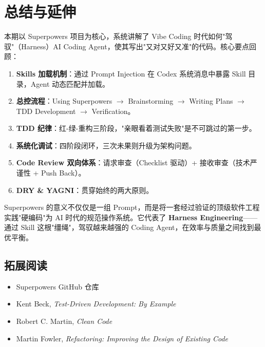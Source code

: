 \section{总结与延伸}

本期以 Superpowers 项目为核心，系统讲解了 Vibe Coding 时代如何"驾驭"（Harness）AI Coding Agent，使其写出"又对又好又准"的代码。核心要点回顾：

\begin{enumerate}
    \item \textbf{Skills 加载机制}：通过 Prompt Injection 在 Codex 系统消息中暴露 Skill 目录，Agent 动态匹配并加载。
    \item \textbf{总控流程}：Using Superpowers $\rightarrow$ Brainstorming $\rightarrow$ Writing Plans $\rightarrow$ TDD Development $\rightarrow$ Verification。
    \item \textbf{TDD 纪律}：红-绿-重构三阶段，"亲眼看着测试失败"是不可跳过的第一步。
    \item \textbf{系统化调试}：四阶段闭环，三次未果则升级为架构问题。
    \item \textbf{Code Review 双向体系}：请求审查（Checklist 驱动）+ 接收审查（技术严谨性 + Push Back）。
    \item \textbf{DRY \& YAGNI}：贯穿始终的两大原则。
\end{enumerate}

Superpowers 的意义不仅仅是一组 Prompt，而是将一套经过验证的顶级软件工程实践"硬编码"为 AI 时代的规范操作系统。它代表了 \textbf{Harness Engineering}——通过 Skill 这根"缰绳"，驾驭越来越强的 Coding Agent，在效率与质量之间找到最优平衡。

\subsection{拓展阅读}

\begin{itemize}
    \item Superpowers GitHub 仓库
    \item Kent Beck, \textit{Test-Driven Development: By Example}
    \item Robert C. Martin, \textit{Clean Code}
    \item Martin Fowler, \textit{Refactoring: Improving the Design of Existing Code}
\end{itemize}



